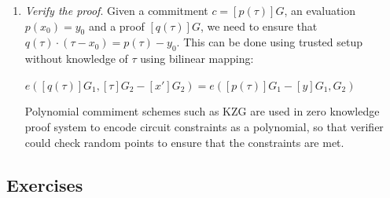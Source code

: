\documentclass[../lecture-notes-148x210.tex]{subfiles}
\begin{document}
\begin{enumerate}
    \vspace{-1mm}
    
    \begin{center}
        $q(x) = \frac{p(x) - y_0}{x - x_0}$.
    \end{center}

    \vspace{-1mm}

    Polynomial $q(x)$ is called ``quotient polynomial`` and only exists if and only if $p(x_0) = y_0$:
    \begin{enumerate}
        \item If $p(x_0) = y_0$, we define $r(x) := p(x) - y_0$;
        \item $r(x)$ has $x_0$ as a root, as $r(x_0) = 0$ by the definition. 
            That is why there exists $q(x)$, such that $r(x) = q(x)\cdot (x-x_0)$;
        \item Hence, the expression $q(x) = \frac{p(x) - y_0}{x-x_0}$ is a polynomial.
    \end{enumerate}
    
    The existance of this quotient polynomial serves
    as a proof of the evaluation. \textit{Prover} calculates proof $\pi = [q(\tau)]G$ and sends it to the \textit{Verifier}.

    \item \textit{Verify the proof}. Given a commitment $c = [p(\tau)]G$, an evaluation $p(x_0) = y_0$ and a proof $[q(\tau)]G$, we need to
    ensure that $q(\tau) \cdot (\tau - x_0) = p(\tau) - y_0$. This can be done using trusted setup without knowledge of $\tau$ using bilinear mapping:

    \vspace{-0.5mm}

    \begin{center}
        $e([q(\tau)]G_1, [\tau]G_2 - [x']G_2) = e([p(\tau)]G_1 - [y]G_1, G_2)$
    \end{center}
    
    \vspace{-1.5mm}

    Polynomial commiment schemes such as KZG are used in zero knowledge proof system to encode circuit constraints as a polynomial, 
    so that verifier could check random points to ensure that the constraints are met.

\end{enumerate}

\subsection{Exercises}
\end{document}
